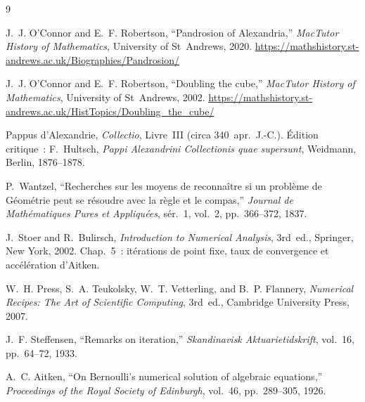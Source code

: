 \documentclass[11pt,a4paper]{article}
\theoremstyle{definition}
\begin{document}
\begin{thebibliography}{9}

J.~J. O'Connor and E.~F. Robertson,
``Pandrosion of Alexandria,''
\textit{MacTutor History of Mathematics}, University of St~Andrews, 2020.
\url{https://mathshistory.st-andrews.ac.uk/Biographies/Pandrosion/}

J.~J. O'Connor and E.~F. Robertson,
``Doubling the cube,''
\textit{MacTutor History of Mathematics}, University of St~Andrews, 2002.
\url{https://mathshistory.st-andrews.ac.uk/HistTopics/Doubling_the_cube/}

Pappus d'Alexandrie,
\textit{Collectio}, Livre~III (circa 340~apr.~J.-C.).
Édition critique~: F.~Hultsch, \textit{Pappi Alexandrini Collectionis quae supersunt},
Weidmann, Berlin, 1876--1878.

P.~Wantzel,
``Recherches sur les moyens de reconnaître si un problème de Géométrie peut se résoudre avec la règle et le compas,''
\textit{Journal de Mathématiques Pures et Appliquées}, sér.~1, vol.~2, pp.~366--372, 1837.

J.~Stoer and R.~Bulirsch,
\textit{Introduction to Numerical Analysis},
3rd~ed., Springer, New York, 2002.
Chap.~5~: itérations de point fixe, taux de convergence et accélération d'Aitken.

W.~H. Press, S.~A. Teukolsky, W.~T. Vetterling, and B.~P. Flannery,
\textit{Numerical Recipes: The Art of Scientific Computing},
3rd~ed., Cambridge University Press, 2007.

J.~F. Steffensen,
``Remarks on iteration,''
\textit{Skandinavisk Aktuarietidskrift}, vol.~16, pp.~64--72, 1933.

A.~C. Aitken,
``On Bernoulli's numerical solution of algebraic equations,''
\textit{Proceedings of the Royal Society of Edinburgh}, vol.~46, pp.~289--305, 1926.

\end{thebibliography}
\end{document}
